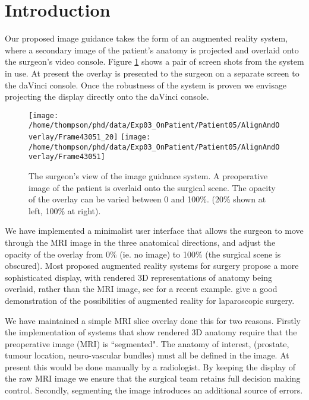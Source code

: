 \documentclass[3p,twocolumn,preprint,10pt]{elsarticle}
\begin{document}
\section{Introduction}
Our proposed image guidance takes the form of an augmented reality system, where
a secondary image of the patient's anatomy is projected and overlaid onto the surgeon's 
video console. Figure \ref{fig:Overlay} shows a pair of screen shots from the system 
in use. At present the overlay is presented to the surgeon on a separate screen to the 
daVinci console. Once the robustness of the system is proven we envisage projecting the 
display directly onto the daVinci console. 

\begin{figure}
\begin{center}
\texttt{[image: /home/thompson/phd/data/Exp03\_OnPatient/Patient05/AlignAndOverlay/Frame43051\_20]}
\texttt{[image: /home/thompson/phd/data/Exp03\_OnPatient/Patient05/AlignAndOverlay/Frame43051]}
\end{center}
\caption{\label{fig:Overlay}The surgeon's view of the image guidance system. A preoperative 
image of the patient is overlaid onto the surgical scene. The opacity of the overlay can 
be varied between 0 and 100\%. (20\% shown at left, 100\% at right).}
\end{figure}

We have implemented a minimalist user interface that allows the surgeon to move through the 
MRI image in the three anatomical directions, and adjust the opacity of the overlay from 
0\% (ie. no image) to 100\% (the surgical scene is obscured). Most proposed 
augmented reality systems for surgery propose a more sophisticated display, with 
rendered 3D representations of anatomy being overlaid, rather than the MRI image, see
\cite{pap208} for a recent example. \cite{pap178} give a good demonstration 
of the possibilities of augmented reality for laparoscopic surgery. 

We have maintained a simple MRI slice overlay  
done this for two reasons. Firstly the implementation of systems that show rendered 3D anatomy
require that the preoperative image (MRI) is ``segmented". The anatomy of interest, 
(prostate, tumour location, neuro-vascular bundles) must all be defined 
in the image. At present this would be done manually by a radiologist.
By keeping the display of the raw MRI image
we ensure that the surgical team retains full decision making control.
Secondly, segmenting the image introduces an additional source of errors. 
\end{document}
